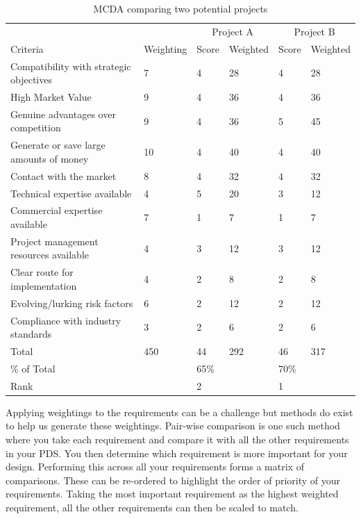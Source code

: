 \begin{table}[h!]
    \centering
    \caption{MCDA comparing two potential projects}\label{tbl-mcda}
    \begin{tabular}{l l l l l l}
        \toprule
        & & \multicolumn{2}{c}{Project A} & \multicolumn{2}{c}{Project B} \\
        Criteria & Weighting & Score & Weighted & Score & Weighted \\
        \midrule
        Compatibility with strategic objectives & 7
        & 4
        & 28
        & 4
        & 28 \\
        High Market Value
        & 9
        & 4
        & 36
        & 4
        & 36 \\
        Genuine advantages over competition
        & 9
        & 4
        & 36
        & 5
        & 45 \\
        Generate or save large amounts of money
        & 10
        & 4
        & 40
        & 4
        & 40 \\
        Contact with the market
        & 8
        & 4
        & 32
        & 4
        & 32 \\
        Technical expertise available
        & 4
        & 5
        & 20
        & 3
        & 12 \\
        Commercial expertise available
        & 7
        & 1
        & 7
        & 1
        & 7 \\
        Project management resources available
        & 4
        & 3
        & 12
        & 3
        & 12\\
        Clear route for implementation
        & 4
        & 2
        & 8
        & 2
        & 8 \\
        Evolving/lurking risk factors
        & 6
        & 2
        & 12
        & 2
        & 12 \\
        Compliance with industry standards
        & 3
        & 2
        & 6
        & 2
        & 6 \\
        Total 
        & 450
        & 44
        & 292
        & 46
        & 317 \\
        \midrule
        \% of Total & & 65\% & & 70\% \\
        Rank & & 2 & & 1 \\
        \bottomrule
    \end{tabular}
    \vspace{1em}
\end{table}

 Applying weightings to the requirements can be a challenge but methods do exist to help us generate these weightings. Pair-wise comparison is one such method where you take each requirement and compare it with all the other requirements in your \ac{PDS}. You then determine which requirement is more important for your design. Performing this across all your requirements forms a matrix of comparisons. These can be re-ordered to highlight the order of priority of your requirements. Taking the most important requirement as the highest weighted requirement, all the other requirements can then be scaled to match.

